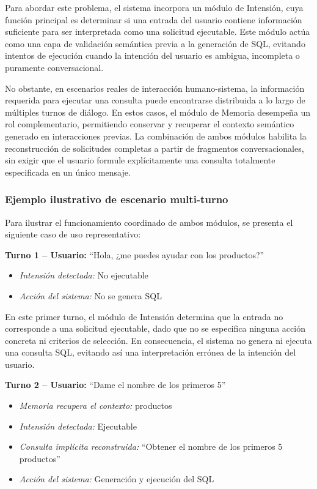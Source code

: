 \documentclass[journal]{IEEEtran}
\begin{document}
Para abordar este problema, el sistema incorpora un módulo de Intensión, cuya función principal es determinar si una entrada del usuario contiene información suficiente para ser interpretada como una solicitud ejecutable. Este módulo actúa como una capa de validación semántica previa a la generación de SQL, evitando intentos de ejecución cuando la intención del usuario es ambigua, incompleta o puramente conversacional.

No obstante, en escenarios reales de interacción humano-sistema, la información requerida para ejecutar una consulta puede encontrarse distribuida a lo largo de múltiples turnos de diálogo. En estos casos, el módulo de Memoria desempeña un rol complementario, permitiendo conservar y recuperar el contexto semántico generado en interacciones previas. La combinación de ambos módulos habilita la reconstrucción de solicitudes completas a partir de fragmentos conversacionales, sin exigir que el usuario formule explícitamente una consulta totalmente especificada en un único mensaje.

\subsubsection{Ejemplo ilustrativo de escenario multi-turno}

Para ilustrar el funcionamiento coordinado de ambos módulos, se presenta el siguiente caso de uso representativo:

\textbf{Turno 1 -- Usuario:} ``Hola, ¿me puedes ayudar con los productos?''

\begin{itemize}
	\item \textit{Intensión detectada:} No ejecutable
	\item \textit{Acción del sistema:} No se genera SQL
\end{itemize}

En este primer turno, el módulo de Intensión determina que la entrada no corresponde a una solicitud ejecutable, dado que no se especifica ninguna acción concreta ni criterios de selección. En consecuencia, el sistema no genera ni ejecuta una consulta SQL, evitando así una interpretación errónea de la intención del usuario.

\textbf{Turno 2 -- Usuario:} ``Dame el nombre de los primeros 5''

\begin{itemize}
	\item \textit{Memoria recupera el contexto:} productos
	\item \textit{Intensión detectada:} Ejecutable
	\item \textit{Consulta implícita reconstruida:} ``Obtener el nombre de los primeros 5 productos''
	\item \textit{Acción del sistema:} Generación y ejecución del SQL
\end{itemize}
\end{document}
